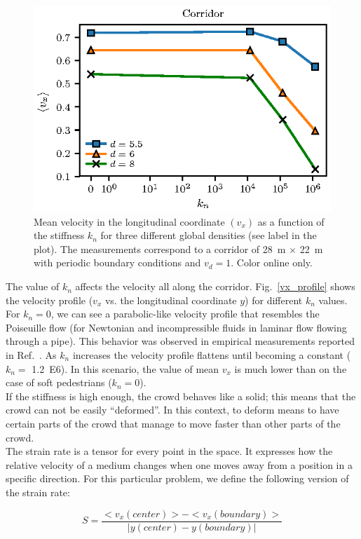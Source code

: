 \documentclass[preprint,12pt]{elsarticle}
\begin{document}
\begin{figure}[htbp!]
\centering
\includegraphics[width=0.7\columnwidth]{./kn_vs_vx_corridor.eps}
\caption{\label{kn_vs_vx_corridor} Mean velocity in the longitudinal coordinate $(v_x)$ as a function of the stiffness $k_n$ for three different global densities (see label in the plot). The measurements correspond to a corridor of 28~m $\times$ 22~m with periodic boundary conditions and $v_d=1$. Color online only.      }
\end{figure}

The value of $k_n$ affects the velocity all along the corridor. Fig.~\ref{vx_profile} shows the velocity profile ($v_x$ vs. the longitudinal coordinate $y$) for different $k_n$ values. For $k_n=0$, we can see a parabolic-like velocity profile that resembles the Poiseuille flow (for Newtonian and incompressible fluids in laminar flow flowing through a pipe). This behavior was observed in empirical measurements reported in Ref.~\cite{zhang2013empirical}. As $k_n$ increases the velocity profile flattens until becoming a constant ($k_n=$ 1.2~E6). In this scenario, the value of mean $v_x$ is much lower than on the case of soft pedestrians ($k_n=$0).\\

If the stiffness is high enough, the crowd behaves like a solid; this means that the crowd can not be easily ``deformed''. In this context, to deform means to have certain parts of the crowd that manage to move faster than other parts of the crowd. \\

The strain rate is a tensor for every point in the space. It expresses how the relative velocity of a medium changes when one moves away from a position in a specific direction. For this particular problem, we define the following version of the strain rate:

\begin{equation}
S = \frac{<v_x(center)> - <v_x(boundary)> }{\left | y(center) - y(boundary) \right |} 
\end{equation}
\end{document}
